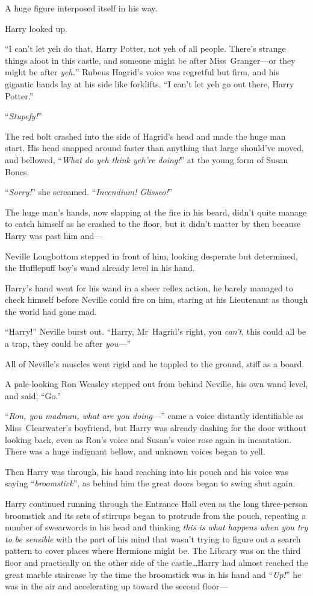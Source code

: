A huge figure interposed itself in his way.

Harry looked up.

“I can’t let yeh do that, Harry Potter, not yeh of all people. There’s strange things afoot in this castle, and someone might be after Miss~Granger—or they might be after \emph{yeh.}” Rubeus Hagrid’s voice was regretful but firm, and his gigantic hands lay at his side like forklifts. “I can’t let yeh go out there, Harry Potter.”

“\emph{Stupefy!}”

The red bolt crashed into the side of Hagrid’s head and made the huge man start. His head snapped around faster than anything that large should’ve moved, and bellowed, “\emph{What do yeh think yeh’re doing!}” at the young form of Susan Bones.

“\emph{Sorry!}” she screamed. “\emph{Incendium! Glisseo!}”

The huge man’s hands, now slapping at the fire in his beard, didn’t quite manage to catch himself as he crashed to the floor, but it didn’t matter by then because Harry was past him and—

Neville Longbottom stepped in front of him, looking desperate but determined, the Hufflepuff boy’s wand already level in his hand.

Harry’s hand went for his wand in a sheer reflex action, he barely managed to check himself before Neville could fire on him, staring at his Lieutenant as though the world had gone mad.

“Harry!” Neville burst out. “Harry, Mr~Hagrid’s right, you \emph{can’t}, this could all be a trap, they could be after \emph{you—}”

All of Neville’s muscles went rigid and he toppled to the ground, stiff as a board.

A pale-looking Ron Weasley stepped out from behind Neville, his own wand level, and said, “Go.”

“\emph{Ron, you madman, what are you doing—}” came a voice distantly identifiable as Miss~Clearwater’s boyfriend, but Harry was already dashing for the door without looking back, even as Ron’s voice and Susan’s voice rose again in incantation. There was a huge indignant bellow, and unknown voices began to yell.

Then Harry was through, his hand reaching into his pouch and his voice was saying “\emph{broomstick}”, as behind him the great doors began to swing shut again.

Harry continued running through the Entrance Hall even as the long three-person broomstick and its sets of stirrups began to protrude from the pouch, repeating a number of swearwords in his head and thinking \emph{this is what happens when you try to be sensible} with the part of his mind that wasn’t trying to figure out a search pattern to cover places where Hermione might be. The Library was on the third floor and practically on the other side of the castle…Harry had almost reached the great marble staircase by the time the broomstick was in his hand and “\emph{Up!}” he was in the air and accelerating up toward the second floor—

